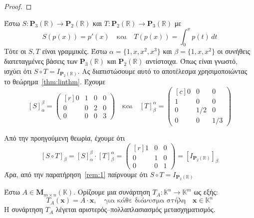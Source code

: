 \begin{proof}
\end{proof}

\begin{example}
  Έστω $ S \colon \textbf{P}_{3}(\mathbb{R}) \to \textbf{P}_{2}(\mathbb{R}) $ 
  και $ T \colon \textbf{P}_{2}(\mathbb{R}) \to \textbf{P}_{3}(\mathbb{R}) $ 
  με 
  \[
    S(p(x)) = p'(x) \quad \text{και} \quad T(p(x)) = \int_{0}^{x} p(t) \,{dt} 
  \] 
  Τότε οι $ S,T $ είναι γραμμικές. Έστω $ \alpha = \{ 1,x,x^{2},x^{3} \} $ και 
  $ \beta = \{ 1,x,x^{2} \} $ οι συνήθεις διατεταγμένες βάσεις των $
  \textbf{P}_{3}(\mathbb{R}) $ και $ \textbf{P}_{2}(\mathbb{R}) $ αντίστοιχα.
  Όπως είναι γνωστό, ισχύει ότι $ S \circ T = I_{\textbf{P}_{2}(\mathbb{R})}$. 
  Ας διαπιστώσουμε αυτό το αποτέλεσμα χρησιμοποιώντας το θεώρημα~\ref{thm:linthm}. 
  Έχουμε
  \[
    [S]_{\alpha}^{\beta} = 
    \begin{pmatrix*}[r]
      0 & 1 & 0 & 0 \\
      0 & 0 & 2 & 0 \\
      0 & 0 & 0 & 3
    \end{pmatrix*} \quad \text{και} \quad [T]_{\beta}^{\alpha} = 
    \begin{pmatrix*}[c]
      0 & 0 & 0 \\
      1 & 0 & 0 \\
      0 & 1/2 & 0 \\
      0 & 0 & 1/3
    \end{pmatrix*}
  \] 
\end{example}
Από την προηγούμενη θεωρία, έχουμε ότι 
\[
  [S \circ T]_{\beta} = [S]_{\alpha}^{\beta} \cdot [T]_{\beta}^{\alpha} = 
  \begin{pmatrix*}[r]
    1 & 0 & 0 \\
    0 & 1 & 0 \\
    0 & 0 & 1
  \end{pmatrix*} = [I_{\textbf{P}_{2}(\mathbb{R})}]_{\beta}
\]
Άρα, από την παρατήρηση~\ref{rem:1} παίρνουμε ότι 
$
S \circ T = I_{\textbf{P}_{2}(\mathbb{R})} 
$

\begin{dfn}
  Έστω $ A \in \textbf{M}_{m \times n}(\mathbb{K})  $. Ορίζουμε μια συνάρτηση 
  $ T_{A} \colon \mathbb{K}^{n} \to \mathbb{K}^{m} $ ως εξής:
  \[
    T_{A}(\mathbf{x}) = A \cdot \mathbf{x}, \quad \text{για κάθε διάνυσμα στήλη} 
    \quad  \mathbf{x} \in \mathbb{K}^{n}  
  \] 
  Η συνάρτηση $ T_{A} $ λέγεται \textcolor{Col1}{αριστερός--πολλαπλασιασμός
  μετασχηματισμός}.
\end{dfn}


